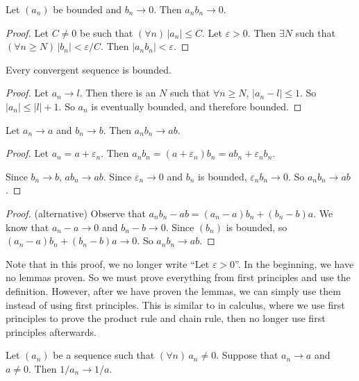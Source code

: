\documentclass[a4paper]{article}
\begin{document}
\begin{lemma}
  Let $(a_n)$ be bounded and $b_n \to 0$. Then $a_nb_n \to 0$.
\end{lemma}

\begin{proof}
  Let $C\not=0$ be such that $(\forall n)\, |a_n|\leq C$. Let $\varepsilon > 0$. Then $\exists N$ such that $(\forall n\geq N)\, |b_n| < \varepsilon/C$. Then $|a_nb_n| < \varepsilon$.
\end{proof}

\begin{lemma}
  Every convergent sequence is bounded.
\end{lemma}

\begin{proof}
  Let $a_n \to l$. Then there is an $N$ such that $\forall n \geq N$, $|a_n - l| \leq 1$. So $|a_n| \leq |l| + 1$. So $a_n$ is eventually bounded, and therefore bounded.
\end{proof}

\begin{lemma}
  Let $a_n\to a$ and $b_n\to b$. Then $a_nb_n\to ab$.
\end{lemma}

\begin{proof}
  Let $a_n = a + \varepsilon_n$. Then $a_nb_n = (a + \varepsilon_n)b_n = ab_n + \varepsilon_n b_n$.

  Since $b_n \to b$, $ab_n \to ab$. Since $\varepsilon_n \to 0$ and $b_n$ is bounded, $\varepsilon_nb_n \to 0$. So $a_nb_n \to ab$.
\end{proof}

\begin{proof}
  (alternative) Observe that $a_nb_n - ab = (a_n - a) b_n + (b_n - b)a$. We know that $a_n - a \to 0$ and $b_n - b\to 0$. Since $(b_n)$ is bounded, so $(a_n - a)b_n + (b_n - b)a \to 0$. So $a_nb_n \to ab$.
\end{proof}

Note that in this proof, we no longer write ``Let $\varepsilon > 0$''. In the beginning, we have no lemmas proven. So we must prove everything from first principles and use the definition. However, after we have proven the lemmas, we can simply use them instead of using first principles. This is similar to in calculus, where we use first principles to prove the product rule and chain rule, then no longer use first principles afterwards.

\begin{lemma}
  Let $(a_n)$ be a sequence such that $(\forall n)\, a_n \not= 0$. Suppose that $a_n \to a$ and $a\not = 0$. Then $1/a_n \to 1/a$.
\end{lemma}
\end{document}
